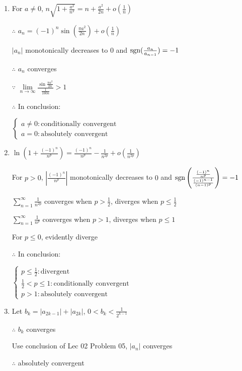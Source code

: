 \begin{enumerate}[1]
\begin{enumerate}[(1)]
     \item
     For $a\not= 0$, $n\sqrt{1+\frac{a^2}{n^2}}=n+\frac{a^2}{2n}+o(\frac{1}{n})$
     \par $\therefore$ $a_n=(-1)^n\sin (\frac{\pi a^2}{2n})+o(\frac{1}{n})$
     \par $\left|a_n\right|$ monotonically decreases to $0$ and $\mathop{\mathrm{sgn}} (\frac{a_n}{a_{n-1}})=-1$
     \par $\therefore$ $a_n$ converges
     \par $\because$ $\lim\limits_{n\rightarrow{\infty}}\frac{\sin \frac{\pi a^2}{2n}}{\frac{1}{100n}}>1$
     \par $\therefore$ In conclusion:
     \par $\begin{cases} 
      a \not= 0:\text{conditionally convergent}
      \\a = 0:\text{absolutely convergent}
      \end{cases}$

     \item
     $\ln \left(1+\frac{(-1)^n}{n^p}\right)=\frac{(-1)^n}{n^p}-\frac{1}{n^{2p}}+o(\frac{1}{n^{2p}})$
     \par For $p>0$, $\left|\frac{(-1)^n}{n^p}\right|$ monotonically decreases to $0$ and $\mathop{\mathrm{sgn}} \left( \frac{\frac{(-1)^n}{n^p}}{\frac{(-1)^{n-1}}{(n-1)^p}}\right) =-1$
     \par $\sum\limits_{n=1}^{\infty}\frac{1}{n^{2p}}$ converges when $p>\frac{1}{2}$, diverges when $p\leqslant\frac{1}{2}$
     \par $\sum\limits_{n=1}^{\infty}\frac{1}{n^{p}}$ converges when $p>1$, diverges when $p\leqslant 1$
     \par For $p\leqslant 0$, evidently diverge
     \par $\therefore$ In conclusion:
     \par $\begin{cases}p \leqslant \frac{1}{2}:\text{divergent}
     \\\frac{1}{2}<p\leqslant 1:\text{conditionally convergent}
     \\p>1:\text{absolutely convergent}
     \end{cases}$

     \item
     Let $b_k=|a_{2k-1}|+|a_{2k}|$, $0<b_k<\frac{1}{2^{k-1}}$
     \par $\therefore$ $b_k$ converges
     \par Use conclusion of Lec 02 Problem 05, $|a_n|$ converges
     \par $\therefore$ absolutely convergent


\end{enumerate}
\end{enumerate}
